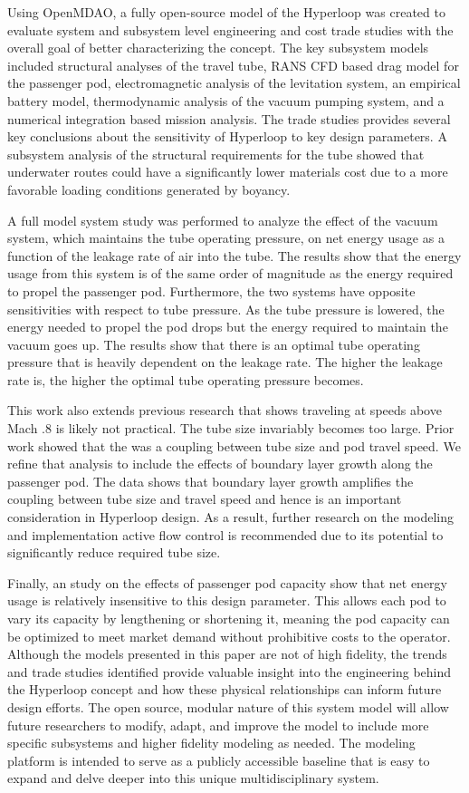 Using OpenMDAO, a fully open-source model of the Hyperloop was created to
evaluate system and subsystem level engineering and cost trade studies with
the overall goal of better characterizing the concept. The key subsystem
models included structural analyses of the travel tube, RANS CFD based drag
model for the passenger pod, electromagnetic analysis of the levitation
system, an empirical battery model, thermodynamic analysis of the vacuum
pumping system, and a numerical integration based mission analysis. The trade
studies provides several key conclusions about the sensitivity of Hyperloop to
key design parameters. A subsystem analysis of the structural requirements
for the tube showed that underwater routes could have a significantly lower
materials cost due to a more favorable loading conditions generated by
boyancy. 

A full model system study was performed to analyze the effect of the vacuum
system, which maintains the tube operating pressure, on net energy usage as a
function of the leakage rate of air into the tube. The results show that the
energy usage from this system is of the same order of magnitude as the energy
required to propel the passenger pod. Furthermore, the two systems have
opposite sensitivities with respect to tube pressure. As the tube pressure is
lowered, the energy needed to propel the pod drops but the energy required to
maintain the vacuum goes up. The results show that there is
an optimal tube operating pressure that is heavily dependent on the leakage
rate. The higher the leakage rate is, the higher the optimal tube operating
pressure becomes.

This work also extends previous research that shows traveling at speeds above
Mach .8 is likely not practical. The tube size invariably becomes too large.
Prior work showed that the was a coupling between tube size and pod travel
speed. We refine that analysis to include the effects of boundary layer growth
along the passenger pod. The data shows that boundary layer growth amplifies
the coupling between tube size and travel speed and hence is an important
consideration in Hyperloop design. As a result, further research on the
modeling and implementation active flow control is recommended due to its
potential to significantly reduce required tube size.

Finally, an study on the effects of passenger pod capacity show that net
energy usage is relatively insensitive to this design parameter. This allows
each pod to vary its capacity by lengthening or shortening it, meaning the
pod capacity can be optimized to meet market demand without prohibitive costs
to the operator. Although the models presented in this paper are not of high
fidelity, the trends and trade studies identified provide valuable insight
into the engineering behind the Hyperloop concept and how these physical
relationships can inform future design efforts. The open source, modular
nature of this system model will allow future researchers to modify, adapt,
and improve the model to include more specific subsystems and higher fidelity
modeling as needed. The modeling platform is intended to serve as a publicly
accessible baseline that is easy to expand and delve deeper into this unique
multidisciplinary system.